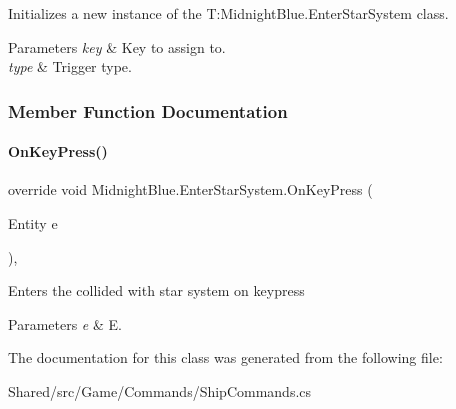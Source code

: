 Initializes a new instance of the T\+:\+Midnight\+Blue.\+Enter\+Star\+System class. 


\begin{DoxyParams}{Parameters}
{\em key} & Key to assign to.\\
\hline
{\em type} & Trigger type.\\
\hline
\end{DoxyParams}


\subsubsection{Member Function Documentation}
\hypertarget{class_midnight_blue_1_1_enter_star_system_a1cf84a93760ef0cda918915ec8acfa4d}{}\label{class_midnight_blue_1_1_enter_star_system_a1cf84a93760ef0cda918915ec8acfa4d} 
\paragraph{\texorpdfstring{On\+Key\+Press()}{OnKeyPress()}}
{\footnotesize\ttfamily override void Midnight\+Blue.\+Enter\+Star\+System.\+On\+Key\+Press (\begin{DoxyParamCaption}\item[{Entity}]{e }\end{DoxyParamCaption})\hspace{0.3cm}{\ttfamily [inline]}, {\ttfamily [protected]}}



Enters the collided with star system on keypress 


\begin{DoxyParams}{Parameters}
{\em e} & E.\\
\hline
\end{DoxyParams}


The documentation for this class was generated from the following file\+:\begin{DoxyCompactItemize}
\item 
Shared/src/\+Game/\+Commands/Ship\+Commands.\+cs\end{DoxyCompactItemize}

